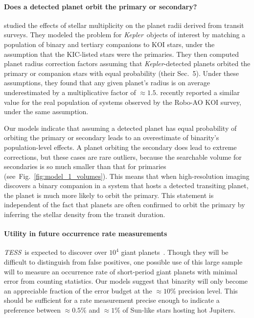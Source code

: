 \documentclass[12pt,modern]{aastex61}
\begin{document}
\paragraph{Does a detected planet orbit the primary or secondary?}
\citet{ciardi_understanding_2015} studied the effects of stellar multiplicity 
on the planet radii derived from transit surveys.
They modeled the problem for {\it Kepler}\ objects of interest by matching a 
population of binary and tertiary companions to KOI stars, 
under the assumption that the KIC-listed stars were the primaries.
They then computed planet radius correction factors assuming that {\it 
    Kepler}-detected planets orbited the primary or companion stars
with equal probability (their Sec.~5).
Under these assumptions, they found that any given planet's radius is on 
average underestimated by a multiplicative factor of $\approx\! 1.5$.
\citet{ziegler_robo-ao_2017} recently reported a similar value for the real
population of systems observed by the Robo-AO KOI survey, under the same 
assumption.

Our models indicate that assuming a detected planet has equal probability of 
orbiting the primary or secondary leads to an overestimate of
binarity's population-level effects.
A planet orbiting the secondary does lead to extreme corrections, but these 
cases are rare outliers, because the searchable volume for secondaries is so 
much smaller than that for primaries (see~Fig.~\ref{fig:model_1_volumes}).
This means that when high-resolution imaging discovers a binary companion in 
a system that hosts a detected transiting planet, the planet is much
more likely to orbit the primary.
This statement is independent of the fact that planets are often confirmed to 
orbit the primary by inferring the stellar density from the transit duration.


\paragraph{Utility in future occurrence rate measurements}
{\it TESS}\ is expected to discover over $10^4$ giant 
planets~\citep{ricker_transiting_2014,sullivan_transiting_2015}.
Though they will be difficult to distinguish from false positives, one 
possible use of this large sample will to measure an occurrence rate of 
short-period giant planets with minimal error from counting statistics.
Our models suggest that binarity will only become an appreciable fraction of 
the error budget at the $\approx 10\%$ precision level.
This should be sufficient for a rate measurement precise enough to indicate a 
preference between $\approx 0.5\%$ and $\approx 1\%$ of Sun-like stars hosting 
hot Jupiters.
\end{document}

